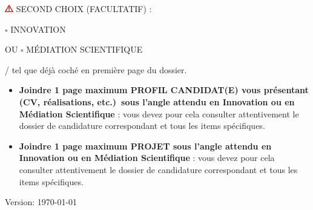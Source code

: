 \documentclass[a4paper,11pt]{article}
\newcommand{\anglaisFrancais}[2]{#2}
\newcommand{\anglaisFrancais}[2]{#1}
\newcommand{\boxunchecked}{$\square$}
\begin{document}
\begin{center}
	\Large
	\includegraphics[width=1em]{warning} \MakeUppercase{\anglaisFrancais{Second choice (optional):}{Second choix (facultatif) :}}

	\bigskip

	\boxunchecked{} \MakeUppercase{Innovation}

	\bigskip

	\MakeUppercase{\anglaisFrancais{or}{ou}} \boxunchecked{} \MakeUppercase{\anglaisFrancais{Scientific mediation}{médiation scientifique}}

	\bigskip

	\small{}/ \anglaisFrancais{as already ticked on the first page of the file}{tel que déjà coché en première page du dossier.}
\end{center}

\bigskip

\begin{itemize}
	\item \anglaisFrancais{%
		\textbf{Attach a maximum of 1 page ``CANDIDATE PROFILE'' presenting yourself (CV, achievements, etc.)\ from the perspective expected in Innovation or Scientific Mediation}: you must carefully consult the corresponding application file and all specific items.
	}{%
		\textbf{Joindre 1 page maximum \og{}PROFIL CANDIDAT(E)\fg{} vous présentant (CV, réalisations, etc.)\ sous l'angle attendu en Innovation ou en Médiation Scientifique} : vous devez pour cela consulter attentivement le dossier de candidature correspondant et tous les items spécifiques.
	}

	\item \anglaisFrancais{\textbf{Attach a maximum of 1 page ``PROJECT'' under the expected aspect of Innovation or Scientific Mediation}: you must carefully consult the corresponding application file and all specific items ;
	}{%
		\textbf{Joindre 1 page maximum \og{}PROJET\fg{} sous l'angle attendu en Innovation ou en Médiation Scientifique} : vous devez pour cela consulter attentivement le dossier de candidature correspondant et tous les items spécifiques.
	}
\end{itemize}



\vspace{3cm}
{\tiny \hfill{}\textcolor{black!20}{Version: \today{}}}
\end{document}

